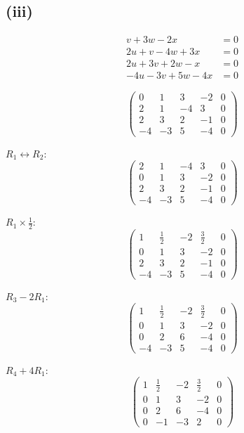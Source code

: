 \subsection*{(iii)}
\begin{align*}
	v + 3w - 2x        & = 0 \\
	2u + v - 4w + 3x   & = 0 \\
	2u + 3v + 2w - x   & = 0 \\
	-4u - 3v + 5w - 4x & = 0
\end{align*}

\[
	\left(\begin{array}{cccc|c}
			0  & 1  & 3  & -2 & 0 \\
			2  & 1  & -4 & 3  & 0 \\
			2  & 3  & 2  & -1 & 0 \\
			-4 & -3 & 5  & -4 & 0
		\end{array}\right)
\]

$R_1 \leftrightarrow R_2$:
\[
	\left(\begin{array}{cccc|c}
			2  & 1  & -4 & 3  & 0 \\
			0  & 1  & 3  & -2 & 0 \\
			2  & 3  & 2  & -1 & 0 \\
			-4 & -3 & 5  & -4 & 0
		\end{array}\right)
\]

$R_1 \times \frac{1}{2}$:
\[
	\left(\begin{array}{cccc|c}
			1  & \frac{1}{2} & -2 & \frac{3}{2} & 0 \\
			0  & 1           & 3  & -2          & 0 \\
			2  & 3           & 2  & -1          & 0 \\
			-4 & -3          & 5  & -4          & 0
		\end{array}\right)
\]

$R_3 - 2R_1$:
\[
	\left(\begin{array}{cccc|c}
			1 & \frac{1}{2} & -2 & \frac{3}{2} & 0 \\
			0 & 1           & 3  & -2          & 0 \\
			0 & 2           & 6  & -4          & 0 \\
			-4 & -3          & 5  & -4          & 0
		\end{array}\right)
\]

$R_4 + 4R_1$:
\[
	\left(\begin{array}{cccc|c}
			1 & \frac{1}{2} & -2 & \frac{3}{2} & 0 \\
			0 & 1           & 3  & -2          & 0 \\
			0 & 2           & 6  & -4          & 0 \\
			0 & -1          & -3 & 2           & 0
		\end{array}\right)
\]

